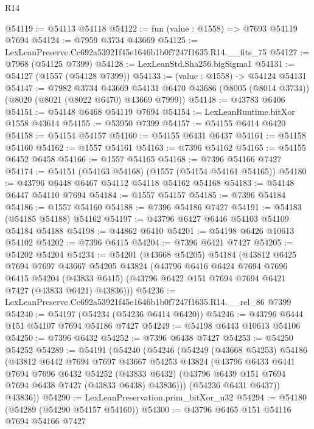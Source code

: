 \begin{lexlean}{R14}
\begin{coremodule}
@54119 := @54113 @54118
@54122 := fun (value : @1558) => @7693 @54119 @7694
@54124 := @7959 @3734 @43669
@54125 := LexLeanPreserve.Cc692a53921f45e1646b1b0f7247f1635.R14.__fits_75
@54127 := @7968 (@54125 @7399)
@54128 := LexLeanStd.Sha256.bigSigma1
@54131 := @54127 (@1557 (@54128 @7399))
@54133 := (value : @1558) -> @54124 @54131
@54147 := @7982
    @3734
    @43669
    @54131
    @6470
    @43686
    (@8005 (@8014 @3734))
    (@8020 (@8021 (@8022 @6470) @43669 @7999))
@54148 := @43783 @6406
@54151 := @54148 @6468 @54119 @7694
@54154 := LexLeanRuntime.bitXor @1558 @43614
@54155 := @53950 @7399
@54157 := @54155 @6414 @6420
@54158 := @54154 @54157
@54160 := @54155 @6431 @6437
@54161 := @54158 @54160
@54162 := @1557 @54161
@54163 := @7396 @54162
@54165 := @54155 @6452 @6458
@54166 := @1557 @54165
@54168 := @7396 @54166 @7427
@54174 := @54151 (@54163 @54168) (@1557 (@54154 @54161 @54165))
@54180 := @43796 @6448 @6467 @54112 @54118 @54162 @54168
@54183 := @54148 @6447 @54110 @7694
@54184 := @1557 @54157
@54185 := @7396 @54184
@54186 := @1557 @54160
@54188 := @7396 @54186 @7427
@54191 := @54183 (@54185 @54188) @54162
@54197 := @43796 @6427 @6446 @54103 @54109 @54184 @54188
@54198 := @44862 @6410
@54201 := @54198 @6426 @10613 @54102
@54202 := @7396 @6415
@54204 := @7396 @6421 @7427
@54205 := @54202 @54204
@54234 := @54201
    (@43668 @54205)
    @54184
    (@43812
      @6425
      @7694
      @7697
      @43667
      @54205
      @43824
      (@43796
        @6416
        @6424
        @7694
        @7696
        @6415
        @54204
        (@43833 @6415)
        (@43796 @6422 @151 @7694 @7694 @6421 @7427 (@43833 @6421) @43836)))
@54236 := LexLeanPreserve.Cc692a53921f45e1646b1b0f7247f1635.R14.__rel_86 @7399
@54240 := @54197 (@54234 (@54236 @6414 @6420))
@54246 := @43796 @6444 @151 @54107 @7694 @54186 @7427
@54249 := @54198 @6443 @10613 @54106
@54250 := @7396 @6432
@54252 := @7396 @6438 @7427
@54253 := @54250 @54252
@54289 := @54191
    (@54240
      (@54246
        (@54249
          (@43668 @54253)
          @54186
          (@43812
            @6442
            @7694
            @7697
            @43667
            @54253
            @43824
            (@43796
              @6433
              @6441
              @7694
              @7696
              @6432
              @54252
              (@43833 @6432)
              (@43796 @6439 @151 @7694 @7694 @6438 @7427 (@43833 @6438) @43836)))
          (@54236 @6431 @6437))
        @43836))
@54290 := LexLeanPreservation.prim_bitXor_u32
@54294 := @54180 (@54289 (@54290 @54157 @54160))
@54300 := @43796 @6465 @151 @54116 @7694 @54166 @7427

\end{coremodule}
\end{lexlean}
